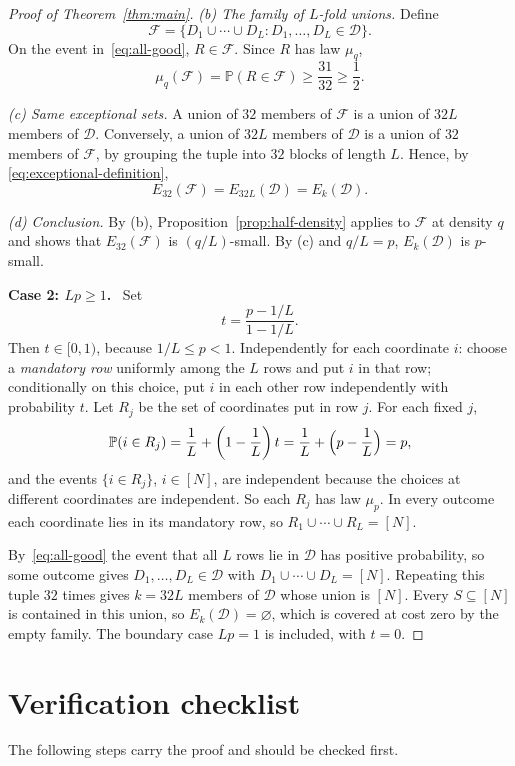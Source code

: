 \documentclass[11pt,letterpaper]{article}
\theoremstyle{definition}
\theoremstyle{remark}
\numberwithin{equation}{section}
\newcommand{\step}[1]{\medskip\noindent\textbf{#1.}\ }
\begin{document}
\begin{proof}[Proof of Theorem~\ref{thm:main}]
\emph{(b) The family of $L$-fold unions.} Define
\[
\mathcal F
=\{D_1\cup\cdots\cup D_L:D_1,\ldots,D_L\in\mathcal D\}.
\]
On the event in~\eqref{eq:all-good}, $R\in\mathcal F$. Since $R$ has law
$\mu_q$,
\[
\mu_q(\mathcal F)=\mathbb P(R\in\mathcal F)
\ge\frac{31}{32}\ge\frac12.
\]

\emph{(c) Same exceptional sets.} A union of $32$ members of $\mathcal F$ is a
union of $32L$ members of $\mathcal D$. Conversely, a union of $32L$ members
of $\mathcal D$ is a union of $32$ members of $\mathcal F$, by grouping the
tuple into $32$ blocks of length $L$. Hence, by
\eqref{eq:exceptional-definition},
\[
E_{32}(\mathcal F)=E_{32L}(\mathcal D)=E_k(\mathcal D).
\]

\emph{(d) Conclusion.} By (b), Proposition~\ref{prop:half-density} applies to
$\mathcal F$ at density $q$ and shows that $E_{32}(\mathcal F)$ is
$(q/L)$-small. By (c) and $q/L=p$, $E_k(\mathcal D)$ is $p$-small.

\step{Case 2: $Lp\ge1$}
Set
\[
t=\frac{p-1/L}{1-1/L}.
\]
Then $t\in[0,1)$, because $1/L\le p<1$. Independently for each coordinate $i$:
choose a \emph{mandatory row} uniformly among the $L$ rows and put $i$ in that
row; conditionally on this choice, put $i$ in each other row independently
with probability $t$. Let $R_j$ be the set of coordinates put in row $j$. For
each fixed $j$,
\[
\mathbb P(i\in R_j)
=\frac1L+\left(1-\frac1L\right)t=\frac1L+\Bigl(p-\frac1L\Bigr)=p,
\]
and the events $\{i\in R_j\}$, $i\in[N]$, are independent because the choices
at different coordinates are independent. So each $R_j$ has law $\mu_p$. In
every outcome each coordinate lies in its mandatory row, so
$R_1\cup\cdots\cup R_L=[N]$.

By~\eqref{eq:all-good} the event that all $L$ rows lie in $\mathcal D$ has
positive probability, so some outcome gives $D_1,\ldots,D_L\in\mathcal D$ with
$D_1\cup\cdots\cup D_L=[N]$. Repeating this tuple $32$ times gives $k=32L$
members of $\mathcal D$ whose union is $[N]$. Every $S\subseteq[N]$ is
contained in this union, so $E_k(\mathcal D)=\varnothing$, which is covered at
cost zero by the empty family. The boundary case $Lp=1$ is included, with
$t=0$.
\end{proof}

\section{Verification checklist}
\label{sec:checklist}

The following steps carry the proof and should be checked first.
\end{document}
